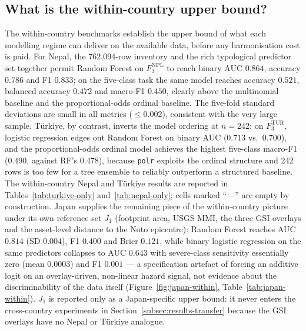 \documentclass[11pt,a4paper]{article}
\begin{document}
\subsection{What is the within-country upper bound?}
\label{subsec:results-within}

The within-country benchmarks establish the upper bound of what each modelling regime can deliver on the available data, before any harmonisation cost is paid. For Nepal, the 762{,}094-row inventory and the rich typological predictor set together permit Random Forest on $F_3^{\text{NPL}}$ to reach binary AUC $0.864$, accuracy $0.786$ and F1 $0.833$; on the five-class task the same model reaches accuracy $0.521$, balanced accuracy $0.472$ and macro-F1 $0.450$, clearly above the multinomial baseline and the proportional-odds ordinal baseline. The five-fold standard deviations are small in all metrics ($\le 0.002$), consistent with the very large sample. T\"urkiye, by contrast, inverts the model ordering at $n=242$: on $F_3^{\text{TUR}}$, logistic regression edges out Random Forest on binary AUC ($0.713$ vs.\ $0.700$), and the proportional-odds ordinal model achieves the highest five-class macro-F1 ($0.490$, against RF's $0.478$), because \texttt{polr} exploits the ordinal structure and 242 rows is too few for a tree ensemble to reliably outperform a structured baseline. The within-country Nepal and T\"urkiye results are reported in Tables~\ref{tab:turkiye-only} and~\ref{tab:nepal-only}; cells marked ``---'' are empty by construction. Japan supplies the remaining piece of the within-country picture under its own reference set $J_1$ (footprint area, USGS MMI, the three GSI overlays and the asset-level distance to the Noto epicentre): Random Forest reaches AUC $0.814$ (SD $0.004$), F1 $0.400$ and Brier $0.121$, while binary logistic regression on the same predictors collapses to AUC $0.643$ with severe-class sensitivity essentially zero (mean $0.0003$) and F1 $0.001$ --- a specification artefact of forcing an additive logit on an overlay-driven, non-linear hazard signal, not evidence about the discriminability of the data itself (Figure~\ref{fig:japan-within}, Table~\ref{tab:japan-within}). $J_1$ is reported only as a Japan-specific upper bound: it never enters the cross-country experiments in Section~\ref{subsec:results-transfer} because the GSI overlays have no Nepal or T\"urkiye analogue.
\end{document}
